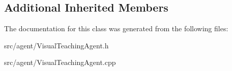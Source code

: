 \subsection*{Additional Inherited Members}


The documentation for this class was generated from the following files\+:\begin{DoxyCompactItemize}
\item 
src/agent/Visual\+Teaching\+Agent.\+h\item 
src/agent/Visual\+Teaching\+Agent.\+cpp\end{DoxyCompactItemize}
